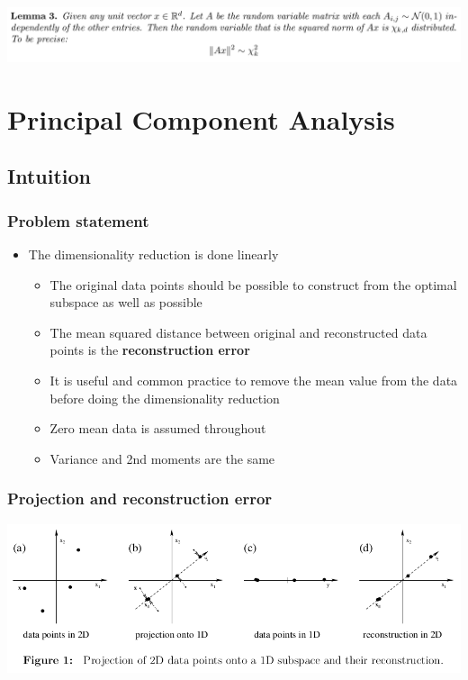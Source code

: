 \documentclass[11pt]{article}
\begin{document}
\begin{center}
\includegraphics[width=.9\linewidth]{Johnson-Lindenstrauss Dimensionality Reduction/screenshot_2018-11-18_13-17-41.png}
\end{center}

\section{Principal Component Analysis}
\label{sec:org0fa4fd6}
\subsection{Intuition}
\label{sec:org5460f69}
\subsubsection{Problem statement}
\label{sec:org46dd89e}
\begin{itemize}
\item The dimensionality reduction is done linearly
\begin{itemize}
\item The original data points should be possible to construct from the optimal subspace as well as possible
\item The mean squared distance between original and reconstructed data points is the \textbf{reconstruction error}
\item It is useful and common practice to remove the mean value from the data before doing the dimensionality reduction
\item Zero mean data is assumed throughout
\item Variance and 2nd moments are the same
\end{itemize}
\end{itemize}

\subsubsection{Projection and reconstruction error}
\label{sec:orgf7805f6}
\begin{center}
\includegraphics[width=.9\linewidth]{Principal Component Analysis/screenshot_2018-11-20_20-03-21.png}
\end{center}
\end{document}
